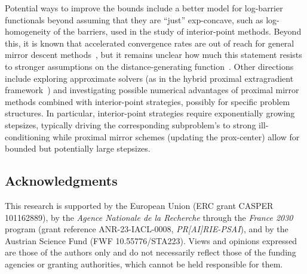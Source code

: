 \documentclass[a4paper]{article}
\begin{document}
\medskip

Potential ways to improve the bounds include a better model for log-barrier
functionals beyond assuming that they are ``just'' exp-concave, such as
log-homogeneity of the barriers, used in the study of interior-point methods.
Beyond this, it is known that accelerated convergence rates are out of reach for general mirror descent methods~\cite{dragomir2022optimal}, but it remains unclear how much this statement resists to stronger assumptions on the distance-generating function~\cite{dragomir2021bregman}.
Other directions include exploring approximate solvers (as in the hybrid
proximal extragradient
framework~\cite{monteiro2010complexity,monteiro2013accelerated}) and
investigating possible numerical advantages of proximal mirror methods combined with interior-point strategies, possibly for specific problem structures.
In particular, interior-point strategies require exponentially growing stepsizes, typically driving the corresponding subproblem's to strong ill-conditioning  while proximal mirror schemes (updating the prox-center) allow for bounded but potentially large stepsizes.

\small
\subsection*{Acknowledgments}
This research is supported by the European Union (ERC grant CASPER 101162889), by the \emph{Agence Nationale de la Recherche} through the \emph{France 2030} program (grant reference ANR-23-IACL-0008, \emph{PR[AI]RIE-PSAI}), and by the Austrian Science Fund (FWF 10.55776/STA223).
Views and opinions expressed are those of the authors only and do not necessarily reflect those of the funding agencies or granting authorities, which cannot be held responsible for them.

{}%


\end{document}
